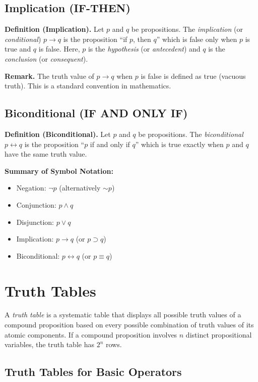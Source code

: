 \documentclass[11pt,a4paper]{article}
\begin{document}
\subsection{Implication (IF-THEN)}

\textbf{Definition (Implication).} Let $p$ and $q$ be propositions. The \textit{implication} (or \textit{conditional}) $p \to q$ is the proposition ``if $p$, then $q$'' which is false only when $p$ is true and $q$ is false. Here, $p$ is the \textit{hypothesis} (or \textit{antecedent}) and $q$ is the \textit{conclusion} (or \textit{consequent}).

\textbf{Remark.} The truth value of $p \to q$ when $p$ is false is defined as true (vacuous truth). This is a standard convention in mathematics.

\subsection{Biconditional (IF AND ONLY IF)}

\textbf{Definition (Biconditional).} Let $p$ and $q$ be propositions. The \textit{biconditional} $p \leftrightarrow q$ is the proposition ``$p$ if and only if $q$'' which is true exactly when $p$ and $q$ have the same truth value.

\textbf{Summary of Symbol Notation:}
\begin{itemize}[label=--]
    \item Negation: $\neg p$ (alternatively $\sim p$)
    \item Conjunction: $p \land q$
    \item Disjunction: $p \lor q$
    \item Implication: $p \to q$ (or $p \supset q$)
    \item Biconditional: $p \leftrightarrow q$ (or $p \equiv q$)
\end{itemize}

\section{Truth Tables}

A \textit{truth table} is a systematic table that displays all possible truth values of a compound proposition based on every possible combination of truth values of its atomic components. If a compound proposition involves $n$ distinct propositional variables, the truth table has $2^n$ rows.

\subsection{Truth Tables for Basic Operators}
\end{document}
